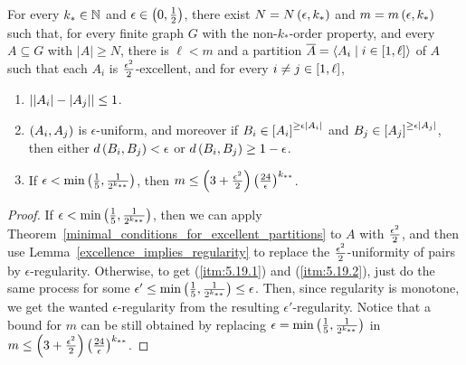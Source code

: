     \theorem[Theorem 5.19]\label{existance_of_regular_partitions}
        For every $k_* \in \mathbb{N}$ and $\epsilon \in \left( 0, {1 \over 2} \right)$, there exist $N = N\left( \epsilon, k_* \right)$
        and $m = m\left( \epsilon, k_* \right)$ such that, for every finite graph $G$ with the non-$k_{*}$-order property,
        and every $A \subseteq G$ with $|A| \geq N$, there is $\ell < m$ and a partition
        $\overline{A} = \left< A_i \mid i \in \left[ 1, \ell \right] \right>$ of $A$ such that each $A_i$ is
        ${{\epsilon^2} \over 2}$-excellent, and for every $i \neq j \in \left[ 1, \ell \right]$,
        \begin{enumerate}
            \item \label{itm:5.19.1} $\left| \left| A_i \right|- \left| A_j \right| \right| \leq 1$.
            \item \label{itm:5.19.2} $\left( A_i, A_j \right)$ is $\epsilon$-uniform, and moreover if
                $B_i \in \left[ A_i \right]^{\geq \epsilon \left| A_i \right|}$ and $B_j \in \left[ A_j \right]^{\geq \epsilon \left| A_j \right|}$,
                then either $d \left( B_i, B_j \right) < \epsilon$ or $d \left( B_i, B_j \right) \geq 1 - \epsilon$.
            \item \label{itm:5.19.3} If $\epsilon < \min \left( \frac{1}{5}, \frac{1}{2^{k_{**}}} \right)$, then
                $m \leq \left( 3 + {{\epsilon^2} \over 2} \right) \left( 24 \over \epsilon \right)^{k_{**}}$.
        \end{enumerate}
        \begin{proof}
            If $\epsilon < \min \left( \frac{1}{5}, \frac{1}{2^{k_{**}}} \right)$, then we can apply Theorem~\ref{minimal_conditions_for_excellent_partitions}
            to $A$ with ${{\epsilon^2} \over 2}$, and then use Lemma~\ref{excellence_implies_regularity} to replace the
            ${{\epsilon^2} \over 2}$-uniformity of pairs by $\epsilon$-regularity.
            Otherwise, to get (\ref{itm:5.19.1}) and (\ref{itm:5.19.2}), just do the same process for some
            $\epsilon' \leq \min \left( \frac{1}{5}, \frac{1}{2^{k_{**}}} \right) \leq \epsilon$.
            Then, since regularity is monotone, we get the wanted $\epsilon$-regularity from the resulting $\epsilon'$-regularity.
            Notice that a bound for $m$ can be still obtained by replacing $\epsilon = \min \left( \frac{1}{5}, \frac{1}{2^{k_{**}}} \right)$
            in $m \leq \left( 3 + {{\epsilon^2} \over 2} \right) \left( 24 \over \epsilon \right)^{k_{**}}$.
        \end{proof}




